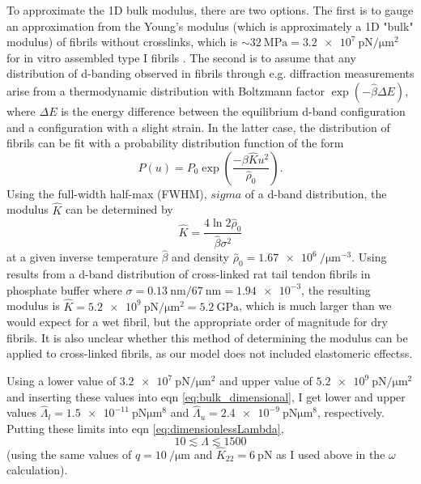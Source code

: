 \documentclass[12pt]{article}
\begin{document}
To approximate the 1D bulk modulus, there are two options. The first is to gauge an approximation from the Young's modulus (which is approximately a 1D "bulk" modulus) of fibrils without crosslinks, which is $\sim\SI{32}{\mega\pascal}=\SI{3.2e7}{\pico\newton\per\micro\meter^2}$ for in vitro assembled type I fibrils \cite{Yang:2008gk}. The second is to assume that any distribution of d-banding observed in fibrils through e.g. diffraction measurements arise from a thermodynamic distribution with Boltzmann factor $\exp(-\hat{\beta}\Delta E)$, where $\Delta E$ is the energy difference between the equilibrium d-band configuration and a configuration with a slight strain. In the latter case, the distribution of fibrils can be fit with a probability distribution function of the form
\begin{equation}\label{eq:dbandpdf}
P(u)=P_0\exp\left(\frac{-\beta\hat{K}u^2}{\hat{\rho}_0}\right).
\end{equation}
Using the full-width half-max (FWHM), $sigma$ of a d-band distribution, the modulus $\hat{K}$ can be determined by
\begin{equation}\label{eq:FWHM}
\hat{K}=\frac{4\ln2\hat{\rho}_0}{\hat{\beta}\sigma^2}
\end{equation}
at a given inverse temperature $\hat{\beta}$ and density $\hat{\rho}_0=\SI{1.67e6}{\per\micro\meter^{-3}}$. Using results from a d-band distribution of cross-linked rat tail tendon fibrils in phosphate buffer \cite{Berenguer:2014fe} where $\sigma=\SI{0.13}{\nano\meter}/\SI{67}{\nano\meter}=\num{1.94e-3}$, the resulting modulus is $\hat{K}=\SI{5.2e9}{\pico\newton\per\micro\meter\squared}=\SI{5.2}{\giga\pascal}$, which is much larger than we would expect for a wet fibril, but the appropriate order of magnitude for dry fibrils. It is also unclear whether this method of determining the modulus can be applied to cross-linked fibrils, as our model does not included elastomeric effectss.

Using a lower value of $\SI{3.2e7}{\pico\newton\per\micro\meter^2}$ and upper value of $\SI{5.2e9}{\pico\newton\per\micro\meter^2}$ and inserting these values into eqn \ref{eq:bulk_dimensional}, I get lower and upper values $\hat{\Lambda}_l=\SI{1.5e-11}{\pico\newton\micro\meter^8}$ and $\hat{\Lambda}_u=\SI{2.4e-9}{\pico\newton\micro\meter^8}$, respectively. Putting these limits into eqn \ref{eq:dimensionlessLambda},
\begin{equation}\label{eq:Lambda}
10\lesssim\Lambda\lesssim1500
\end{equation}
(using the same values of $\hat{q}=\SI{10}{\per\micro\meter}$ and $\hat{K}_{22}=\SI{6}{\pico\newton}$ as I used above in the $\omega$ calculation).
\clearpage


\end{document}
